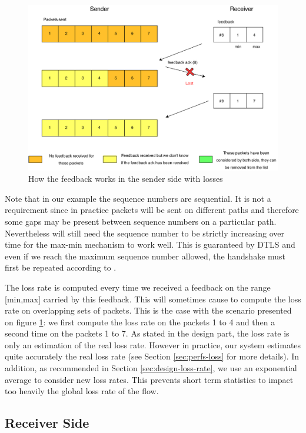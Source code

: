 \begin{figure}[!ht]
\centering
\includegraphics[width=\textwidth]{images/Feedback-implem2.eps}
\caption{How the feedback works in the sender side with losses}
\label{fig:feedback-imp2}
\end{figure}

Note that in our example the sequence numbers are sequential. It is not a requirement since in practice packets will be sent on different paths and therefore some gaps may be present between sequence numbers on a particular path. Nevertheless will still need the sequence number to be strictly increasing over time for the max-min mechanism to work well. This is guaranteed by DTLS and even if we reach the maximum sequence number allowed, the handshake must first be repeated according to \cite{rfc5246}.

The loss rate is computed every time we received a feedback on the range [min,max] carried by this feedback. This will sometimes cause to compute the loss rate on overlapping sets of packets. This is the case with the scenario presented on figure \ref{fig:feedback-imp2}: we first compute the loss rate on the packets 1 to 4 and then a second time on the packets 1 to 7. As stated in the design part, the loss rate is only an estimation of the real loss rate. However in practice, our system estimates quite accurately the real loss rate (see Section \ref{sec:perfs-loss} for more details). In addition, as recommended in Section \ref{sec:design-loss-rate}, we use an exponential average to consider new loss rates. This prevents short term statistics to impact too heavily the global loss rate of the flow.

\subsection{Receiver Side}


